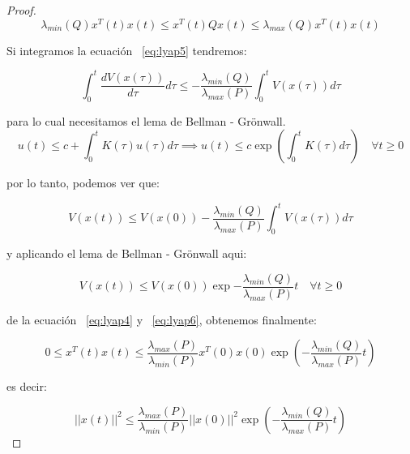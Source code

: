\begin{proof}
            \begin{equation*}
                \lambda_{min}(Q) x^T(t) x(t) \le x^T(t) Q x(t) \le \lambda_{max}(Q) x^T(t) x(t)
            \end{equation*}

            Si integramos la ecuación ~\ref{eq:lyap5} tendremos:

            \begin{equation*}
                \int_{0}^{t}\frac{dV(x(\tau))}{d\tau} d\tau \le - \frac{\lambda_{min}(Q)}{\lambda_{max}(P)} \int_{0}^{t} V(x(\tau)) d\tau
            \end{equation*}

            para lo cual necesitamos el lema de Bellman - Grönwall.
            \begin{equation*}
                u(t) \le c + \int_0^t K(\tau) u(\tau) d\tau \implies u(t) \le c \exp{\left( \int_0^t K(\tau) d\tau \right)} \quad \forall t \ge 0
            \end{equation*}

            por lo tanto, podemos ver que:

            \begin{equation}
                V(x(t)) \le V(x(0)) - \frac{\lambda_{min}(Q)}{\lambda_{max}(P)} \int_0^t V(x(\tau)) d\tau
            \end{equation}

            y aplicando el lema de Bellman - Grönwall aqui:

            \begin{equation} \label{eq:lyap6}
                V(x(t)) \le V(x(0)) \exp{- \frac{\lambda_{min}(Q)}{\lambda_{max}(P)} t} \quad \forall t \ge 0
            \end{equation}

            de la ecuación ~\ref{eq:lyap4} y ~\ref{eq:lyap6}, obtenemos finalmente:

            \begin{equation*}
                0 \le x^T(t)x(t) \le \frac{\lambda_{max}(P)}{\lambda_{min}(P)} x^T(0)x(0) \exp{\left( - \frac{\lambda_{min}(Q)}{\lambda_{max}(P)} t \right)}
            \end{equation*}

            es decir:

            \begin{equation*}
                ||x(t)||^2 \le \frac{\lambda_{max}(P)}{\lambda_{min}(P)} ||x(0)||^2 \exp{\left( - \frac{\lambda_{min}(Q)}{\lambda_{max}(P)} t \right)}
            \end{equation*}


\end{proof}
